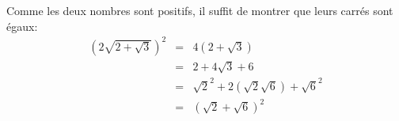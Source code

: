 Comme les deux nombres sont positifs, il suffit de montrer que leurs carrés sont égaux:
\begin{eqnarray*}
  \left( 2\sqrt{2+\sqrt{3}} \right)^2 &=& 4(2+\sqrt{3}) \\
  &=& 2 + 4\sqrt{3} + 6\\
  &=& \sqrt{2}^2 + 2(\sqrt{2}\sqrt{6}) + \sqrt{6}^2 \\
  &=& (\sqrt{2}+\sqrt{6})^2
\end{eqnarray*}
